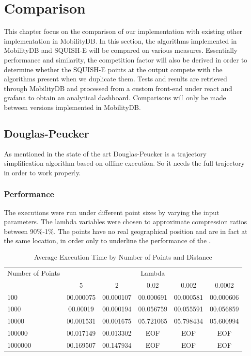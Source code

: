 

\chapter{Comparison}
This chapter focus on the comparison of our implementation with existing other implementation in MobilityDB.  In this section, the algorithms implemented in MobilityDB and SQUISH-E will be compared on various measures. Essentially performance and similarity, the competition factor will also be derived in order to determine whether the SQUISH-E points at the output compete with the algorithms present when we duplicate them. Tests and results are retrieved through MobilityDB and processed from a custom front-end under react and grafana to obtain an analytical dashboard. Comparisons will only be made between versions implemented in MobilityDB.


\section{Douglas-Peucker}

As mentioned in the state of the art Douglas-Peucker is a trajectory simplification algorithm based on offline execution. So it needs the full trajectory in order to work properly.

\subsection{Performance}
The executions were run under different point sizes by varying the input parameters. The lambda variables were chosen to approximate compression ratios between 90\%-1\%. The points have no real geographical position and are in fact at the same location, in order only to underline the performance of the .

\begin{table}[htbp]
    \centering
    \label{tab:execution_time_douglas}
    \begin{tabular}{@{}lccccc@{}}
        \toprule
        Number of Points & \multicolumn{5}{c}{Lambda} \\
        \cmidrule{2-6}
        & 5         & 2       & 0.02        & 0.002       & 0.0002       \\
        \midrule
        100              & 00.000075 & 00.000107 & 00.000691 & 00.000581 & 00.000606 \\
        1000             & 00.00019  & 00.000194 & 00.056759 & 00.055591 & 00.056859 \\
        10000            & 00.001531 & 00.001675 & 05.721065 & 05.798434 & 05.600994 \\
        100000           & 00.017149  & 00.013302  & EOF & EOF & EOF \\
        1000000          & 00.169507 & 00.147934 & EOF & EOF & EOF \\
        \bottomrule
    \end{tabular}
    \caption{Average Execution Time by Number of Points and Distance}
\end{table}

